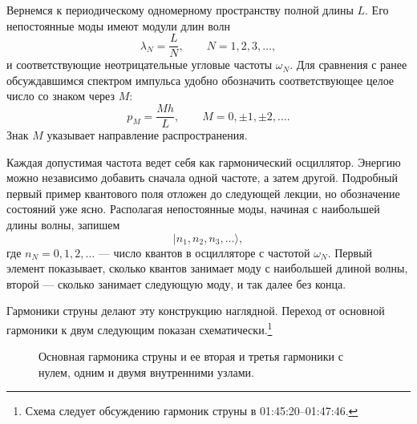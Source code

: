 Вернемся к периодическому одномерному пространству полной длины \(L\). Его непостоянные моды имеют модули длин волн
\begin{equation}
\lambda_N=\frac{L}{N},
\qquad N=1,2,3,\ldots ,
\end{equation}
и соответствующие неотрицательные угловые частоты \(\omega_N\). Для сравнения с ранее обсуждавшимся спектром импульса удобно обозначить соответствующее целое число со знаком через \(M\):
\begin{equation}
p_M=\frac{Mh}{L},
\qquad M=0,\pm1,\pm2,\ldots .
\end{equation}
Знак \(M\) указывает направление распространения.

Каждая допустимая частота ведет себя как гармонический осциллятор. Энергию можно независимо добавить сначала одной частоте, а затем другой. Подробный первый пример квантового поля отложен до следующей лекции, но обозначение состояний уже ясно. Располагая непостоянные моды, начиная с наибольшей длины волны, запишем
\begin{equation}
|n_1,n_2,n_3,\ldots\rangle,
\end{equation}
где \(n_N=0,1,2,\ldots\) — число квантов в осцилляторе с частотой \(\omega_N\). Первый элемент показывает, сколько квантов занимает моду с наибольшей длиной волны, второй — сколько занимает следующую моду, и так далее без конца.

Гармоники струны делают эту конструкцию наглядной. Переход от основной гармоники к двум следующим показан схематически.\footnote{Схема следует обсуждению гармоник струны в 01:45:20--01:47:46.}

\begin{figure}[t]
\centering
{}
\caption{Основная гармоника струны и ее вторая и третья гармоники с нулем, одним и двумя внутренними узлами.}
\end{figure}

